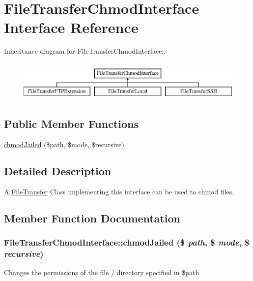 \hypertarget{interfaceFileTransferChmodInterface}{
\section{FileTransferChmodInterface Interface Reference}
\label{interfaceFileTransferChmodInterface}
}
Inheritance diagram for FileTransferChmodInterface::\begin{figure}[H]
\begin{center}
\leavevmode
\includegraphics[height=2cm]{interfaceFileTransferChmodInterface}
\end{center}
\end{figure}
\subsection*{Public Member Functions}
\begin{DoxyCompactItemize}
\item 
\hyperlink{interfaceFileTransferChmodInterface_a031e451823be199251562369d1f760f0}{chmodJailed} (\$path, \$mode, \$recursive)
\end{DoxyCompactItemize}


\subsection{Detailed Description}
A \hyperlink{classFileTransfer}{FileTransfer} Class implementing this interface can be used to chmod files. 

\subsection{Member Function Documentation}
\hypertarget{interfaceFileTransferChmodInterface_a031e451823be199251562369d1f760f0}{
\subsubsection[{chmodJailed}]{\setlength{\rightskip}{0pt plus 5cm}FileTransferChmodInterface::chmodJailed (\$ {\em path}, \/  \$ {\em mode}, \/  \$ {\em recursive})}}
\label{interfaceFileTransferChmodInterface_a031e451823be199251562369d1f760f0}
Changes the permissions of the file / directory specified in \$path


